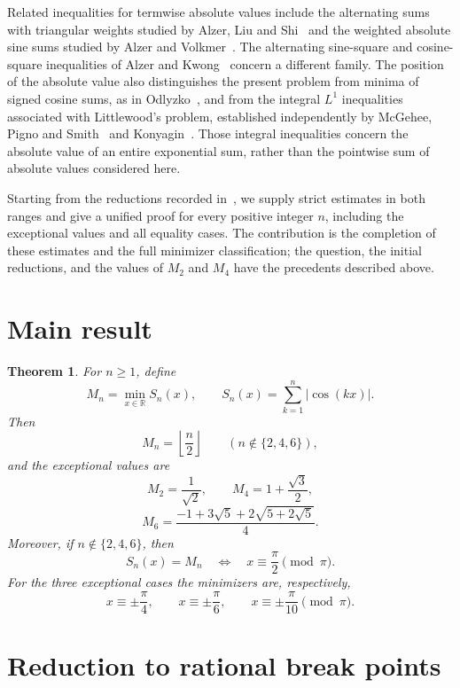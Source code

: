 \documentclass[11pt]{article}
\newtheorem{theorem}{Theorem}
\begin{document}
Related inequalities for termwise absolute values include the alternating
sums with triangular weights studied by Alzer, Liu and Shi~\cite{AlzerLiuShi2013} and the weighted absolute sine sums studied by
Alzer and Volkmer~\cite{AlzerVolkmer2026}. The alternating sine-square
and cosine-square inequalities of Alzer and Kwong~\cite{AlzerKwong2017} concern a different family. The position of the
absolute value also distinguishes the present problem from minima of
signed cosine sums, as in Odlyzko~\cite{Odlyzko1982}, and from the
integral \(L^1\) inequalities associated with Littlewood's problem,
established independently by McGehee, Pigno and Smith~\cite{McGeheePignoSmith1981} and Konyagin~\cite{Konyagin1982}.
Those integral inequalities concern the absolute value of an entire
exponential sum, rather than the pointwise sum of absolute values
considered here.

Starting from the reductions recorded in~\cite{MSE2022}, we supply
strict estimates in both ranges and give a unified proof for every
positive integer \(n\), including the exceptional values and all
equality cases. The contribution is the completion of these estimates
and the full minimizer classification; the question, the initial
reductions, and the values of \(M_2\) and \(M_4\) have the precedents
described above.

\section{Main result}

\begin{theorem}\label{thm:main}
For \(n\ge 1\), define
\[
        M_n=\min_{x\in\mathbb R} S_n(x),
        \qquad
        S_n(x)=\sum_{k=1}^n |\cos(kx)|.
\]
Then
\[
        M_n=\left\lfloor\frac n2\right\rfloor
        \qquad (n\notin\{2,4,6\}),
\]
and the exceptional values are
\[
        M_2=\frac1{\sqrt2},\qquad
        M_4=1+\frac{\sqrt3}{2},
\]
\[
        M_6=
        \frac{-1+3\sqrt5+2\sqrt{5+2\sqrt5}}4.
\]
Moreover, if \(n\notin\{2,4,6\}\), then
\[
        S_n(x)=M_n
        \quad\Longleftrightarrow\quad
        x\equiv \frac{\pi}{2}\pmod{\pi}.
\]
For the three exceptional cases the minimizers are, respectively,
\[
        x\equiv \pm\frac{\pi}{4},\qquad
        x\equiv \pm\frac{\pi}{6},\qquad
        x\equiv \pm\frac{\pi}{10}
        \pmod{\pi}.
\]
\end{theorem}

\section{Reduction to rational break points}\label{sec:reduction}
\end{document}

